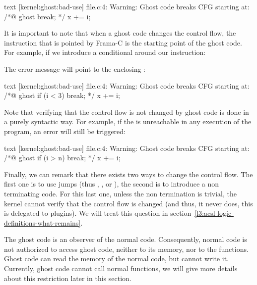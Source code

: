 \begin{CodeBlock}{text}
[kernel:ghost:bad-use] file.c:4: Warning:
  Ghost code breaks CFG starting at:
  /*@ ghost break; */
  x += i;
\end{CodeBlock}


It is important to note that when a ghost code changes the control
flow, the instruction that is pointed by Frama-C is the starting
point of the ghost code. For example, if we introduce a conditional
around our  instruction:




The error message will point to the enclosing :


\begin{CodeBlock}{text}
[kernel:ghost:bad-use] file.c:4: Warning:
  Ghost code breaks CFG starting at:
  /*@ ghost if (i < 3) break; */
  x += i;
\end{CodeBlock}


Note that verifying that the control flow is not changed by ghost
code is done in a purely syntactic way. For example, if the
 is unreachable in any execution of the program,
an error will still be triggered:




\begin{CodeBlock}{text}
[kernel:ghost:bad-use] file.c:4: Warning:
  Ghost code breaks CFG starting at:
  /*@ ghost if (i > n) break; */
  x += i;
\end{CodeBlock}


Finally, we can remark that there exists two ways to change the control
flow. The first one is to use jumps (thus ,
, or ), the second is to
introduce a non terminating code. For this last one, unless the non
termination is trivial, the kernel cannot verify that the control
flow is changed (and thus, it never does, this is delegated to plugins).
We will treat this question in
section~\ref{l3:acsl-logic-definitions-what-remains}.




The ghost code is an observer of the normal code. Consequently, normal
code is not authorized to access ghost code, neither to its memory,
nor to the functions. Ghost code can read the memory of the normal code,
but cannot write it. Currently, ghost code cannot call normal functions,
we will give more details about this restriction later in this section.



